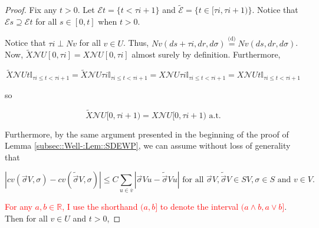 \documentclass[12pt]{article}
\newcommand{\mb}{\mathbb}
\newcommand{\mc}{\mathcal}
\newcommand{\ov}{\overline}
\newcommand{\te}{\text}
\newcommand{\tr}{\textcolor{red}}
\newcommand{\ind}{\hspace{24pt}}
\newcommand{\deq}{\overset{\text{(d)}}{=}}			%
\renewcommand{\v}{v}							%
\newcommand{\vv}{u}								%
\renewcommand{\U}{U}							%
\renewcommand{\S}{S}							%
\newcommand{\s}{\sigma}							%
\newcommand{\sv}{\vec{\s}}						%
\renewcommand{\t}{t}							%
\renewcommand{\tt}{s}							%
\newcommand{\X}{X}								%
\newcommand{\IGr}{c}							%
\newcommand{\neigh}{\mc{N}}						%
\newcommand{\cl}{\ov}							%
\newcommand{\const}{C}							%
\newcommand{\poiss}{N}							%
\newcommand{\alt}[1]{\widetilde{#1}}			%
\newcommand{\rt}{\tau}							%
\newcommand{\evnt}{\mc{E}}						%
\begin{document}
\begin{proof}
\ind Fix any \(\t > 0\). Let \(\evnt{\t} = \{\t < \rt{i+1}\}\) and \(\alt{\evnt}{	} = \{\t\in [\rt{i},\rt{i+1})\}\). Notice that \(\evnt{\tt} \supseteq \evnt{\t}\) for all \(\tt\in [0,\t]\) when \(\t > 0\). 

\ind Notice that \(\rt{i} \perp \poiss{\v}\) for all \(\v \in \U\). Thus, \(\poiss{\v}(d\tt+\rt{i},dr,d\s) \deq \poiss{\v}(d\tt,dr,d\s)\). Now, \(\alt{\X}{\neigh{\U}}{}[0,\rt{i}] = \X{\neigh{\U}}{[0,\rt{i}]}\) almost surely by definition. Furthermore,

\[\alt{\X}{\neigh{\U}}{\t}\mb{I}_{\rt{i}\leq \t < \rt{i+1}} = \alt{\X}{\neigh{\U}}{\rt{i}}\mb{I}_{\rt{i}\leq \t < \rt{i+1}} = \X{\neigh{\U}}{\rt{i}}\mb{I}_{\rt{i}\leq \t < \rt{i+1}} = \X{\neigh{\U}}{\t}\mb{I}_{\rt{i}\leq \t < \rt{i+1}}\]

so

\[\alt{\X}{\neigh{\U}}{}[0,\rt{i+1}) = \X{\neigh{\U}}{[0,\rt{i+1})} \te{ a.t.}\]

Furthermore, by the same argument presented in the beginning of the proof of Lemma \ref{subsec::Well-:Lem::SDEWP}, we can assume without loss of generality that 

\[|\IGr{\v}(\sv{V}{},\s) - \IGr{\v}(\alt{\sv}{V}{},\s)| \leq \const{}\sum_{\vv\in \cl{\v}} |\sv{V}{\vv} - \alt{\sv}{V}{\vv}|\te{ for all } \sv{V}{},\alt{\sv}{V}{}\in \S{V},\s \in \S \te{ and } \v \in V.\]

\tr{For any \(a,b\in \mb{R}\), I use the shorthand \((a,b]\) to denote the interval \((a\wedge b,a\vee b]\)}. Then for all \(v\in \U\) and \(\t > 0\),


\end{proof}
\end{document}
